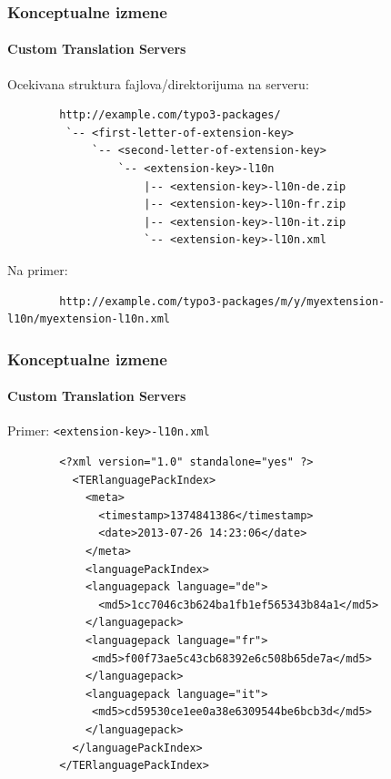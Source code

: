 
\begin{frame}[fragile]
	\frametitle{Konceptualne izmene}
	\framesubtitle{Custom Translation Servers}

	Ocekivana struktura fajlova/direktorijuma na serveru:

	\begin{lstlisting}
		http://example.com/typo3-packages/
		 `-- <first-letter-of-extension-key>
		     `-- <second-letter-of-extension-key>
		         `-- <extension-key>-l10n
		             |-- <extension-key>-l10n-de.zip
		             |-- <extension-key>-l10n-fr.zip
		             |-- <extension-key>-l10n-it.zip
		             `-- <extension-key>-l10n.xml
	\end{lstlisting}

	Na primer:

	\begin{lstlisting}
		http://example.com/typo3-packages/m/y/myextension-l10n/myextension-l10n.xml
	\end{lstlisting}

\end{frame}


\begin{frame}[fragile]
	\frametitle{Konceptualne izmene}
	\framesubtitle{Custom Translation Servers}

	Primer: \texttt{<extension-key>-l10n.xml}

	\lstset{
		basicstyle=\tiny\ttfamily
	}

	\begin{lstlisting}
		<?xml version="1.0" standalone="yes" ?>
		  <TERlanguagePackIndex>
		    <meta>
		      <timestamp>1374841386</timestamp>
		      <date>2013-07-26 14:23:06</date>
		    </meta>
		    <languagePackIndex>
		    <languagepack language="de">
		      <md5>1cc7046c3b624ba1fb1ef565343b84a1</md5>
		    </languagepack>
		    <languagepack language="fr">
		     <md5>f00f73ae5c43cb68392e6c508b65de7a</md5>
		    </languagepack>
		    <languagepack language="it">
		     <md5>cd59530ce1ee0a38e6309544be6bcb3d</md5>
		    </languagepack>
		  </languagePackIndex>
		</TERlanguagePackIndex>
	\end{lstlisting}

\end{frame}

